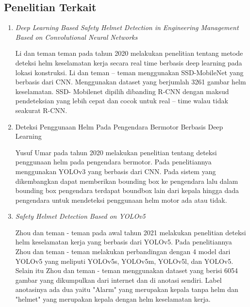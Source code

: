\subsection{Penelitian Terkait}
\begin{enumerate}
  \item \emph{Deep Learning Based Safety Helmet Detection in Engineering Management Based on Convolutional Neural Networks} 
  \par Li dan teman teman pada tahun 2020 melakukan penelitian tentang metode deteksi helm keselamatan kerja secara real time berbasis deep learning pada lokasi konstruksi. Li dan teman – teman menggunakan SSD-MobileNet yang berbasis dari CNN. Menggunakan dataset yang berjumlah 3261 gambar helm keselamatan. SSD- Mobilenet dipilih dibanding R-CNN dengan maksud pendeteksian yang lebih cepat dan cocok untuk real – time walau tidak seakurat R-CNN. \cite{li2020deep}
  
  \item Deteksi Penggunaan Helm Pada Pengendara Bermotor Berbasis Deep Learning 
  \par Yusuf Umar pada tahun 2020 melakukan penelitian tentang deteksi penggunaan helm pada pengendara bermotor. Pada penelitiannya menggunakan YOLOv3 yang berbasis dari CNN. Pada sistem yang dikembangkan dapat memberikan bounding box ke pengendara lalu dalam bounding box pengendara terdapat boundbox lain dari kepala hingga dada pengendara untuk mendeteksi penggunaan helm motor ada atau tidak. \cite{hanafi2020deteksi}

  \item \emph{Safety Helmet Detection Based on YOLOv5}
  \par Zhou dan teman - teman pada awal tahun 2021 melakukan penelitian deteksi helm keselamatan kerja yang berbasis dari YOLOv5. Pada penelitiannya Zhou dan teman - teman melakukan perbandingan dengan 4 model dari YOLOv5 yang meliputi YOLOv5s, YOLOv5m, YOLOv5l, dan YOLOv5. Selain itu Zhou dan teman - teman menggunakan dataset yang berisi 6054 gambar yang dikumpulkan dari
  internet dan di anotasi sendiri. Label anotasinya ada dua yaitu "Alarm" yang merupakan kepala tanpa helm dan
  "helmet" yang merupakan kepala dengan helm keselamatan kerja\cite{zhou_zhao_nie_2021}.
\end{enumerate}

